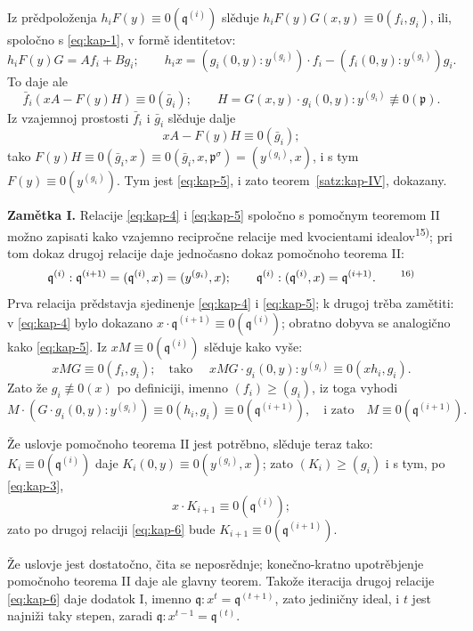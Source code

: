\documentclass[11pt]{article}
\theoremstyle{plain}
\begin{document}
Iz prědpoloženja $h_{i}F(y) \equiv 0(\mathfrak{q}^{(i)})$
slěduje
$h_{i}F(y)G(x,y) \equiv 0(f_{i}, g_{i})$, ili, spoločno
s \eqref{eq:kap-1}, v formě identitetov:
\[
h_{i}F(y)G = Af_{i} + Bg_{i}; \qquad
h_{i}x = (g_{i}(0,y):y^{(g_{i})})\cdot f_{i}
- (f_{i}(0,y):y^{(g_{i})})g_{i}.
\]
To daje ale
\[
\bar{f}_{i}(xA - F(y)H) \equiv 0(\bar{g}_{i}); \qquad
H = G(x,y) \cdot g_{i}(0,y) : y^{(g_{i})} \not\equiv 0(\mathfrak{p}).
\]
Iz vzajemnoj prostosti $\bar{f}_{i}$ i $\bar{g}_{i}$ slěduje dalje
\[
xA - F(y)H \equiv 0(\bar{g}_{i});
\]
tako $F(y)H \equiv 0(\bar{g}_{i}, x)
\equiv 0(\bar{g}_{i}, x, \mathfrak{p}^{\sigma})
= (y^{(g_{i})}, x)$, i s tym $F(y) \equiv 0(y^{(g_{i})})$.
Tym jest \eqref{eq:kap-5}, i zato teorem~\ref{satz:kap-IV}, dokazany.

\smallskip
\textbf{Zamětka I.} Relacije \eqref{eq:kap-4} i \eqref{eq:kap-5}
spoločno s pomočnym teoremom II možno zapisati kako vzajemno
recipročne relacije med kvocientami idealov\textsuperscript{15)};
pri tom dokaz drugoj relacije daje jednočasno dokaz pomočnoho
teorema II:
\begin{equation}\label{eq:kap-6}
\mathfrak{q}^{(i)} : \mathfrak{q}^{(i+1)}
= (\mathfrak{q}^{(i)}, x) = (y^{(g_{i})}, x); \qquad
\mathfrak{q}^{(i)} : (\mathfrak{q}^{(i)}, x)
= \mathfrak{q}^{(i+1)}.\qquad\text{\textsuperscript{16)}}
\end{equation}
Prva relacija prědstavja sjedinenje \eqref{eq:kap-4} i
\eqref{eq:kap-5}; k drugoj trěba zamětiti: v \eqref{eq:kap-4}
bylo dokazano
$x \cdot \mathfrak{q}^{(i+1)} \equiv 0(\mathfrak{q}^{(i)})$;
obratno dobyva se analogično kako \eqref{eq:kap-5}. Iz
$xM \equiv 0(\mathfrak{q}^{(i)})$ slěduje kako vyše:
\[
xMG \equiv 0(f_{i}, g_{i}); \quad \text{tako }\quad
xMG \cdot g_{i}(0,y) : y^{(g_{i})}
\equiv 0(xh_{i}, g_{i}).
\]
Zato že $g_{i} \not\equiv 0(x)$ po definiciji, imenno
$(f_{i}) \geq (g_{i})$, iz toga vyhodi
\[
M \cdot (G \cdot g_{i}(0,y) : y^{(g_{i})})
\equiv 0(h_{i}, g_{i}) \equiv 0(\mathfrak{q}^{(i+1)}),
\quad\text{i zato}\quad M \equiv 0(\mathfrak{q}^{(i+1)}).
\]

Že uslovje pomočnoho teorema II jest potrěbno, slěduje teraz tako:
$K_{i} \equiv 0(\mathfrak{q}^{(i)})$ daje
$K_{i}(0,y) \equiv 0(y^{(g_{i})}, x)$; zato
$(K_{i}) \geq (g_{i})$ i s tym, po \eqref{eq:kap-3},
\[
x \cdot K_{i+1} \equiv 0(\mathfrak{q}^{(i)});
\]
zato po drugoj relaciji \eqref{eq:kap-6} bude
$K_{i+1} \equiv 0(\mathfrak{q}^{(i+1)})$.

Že uslovje jest dostatočno, čita se neposrědnje; konečno-kratno
upotrěbjenje pomočnoho teorema II daje ale glavny teorem. Takože
iteracija drugoj relacije \eqref{eq:kap-6} daje dodatok I, imenno
$\mathfrak{q} : x^{t} = \mathfrak{q}^{(t+1)}$, zato jediničny
ideal, i $t$ jest najniži taky stepen, zaradi
$\mathfrak{q} : x^{t-1} = \mathfrak{q}^{(t)}$.
\end{document}
